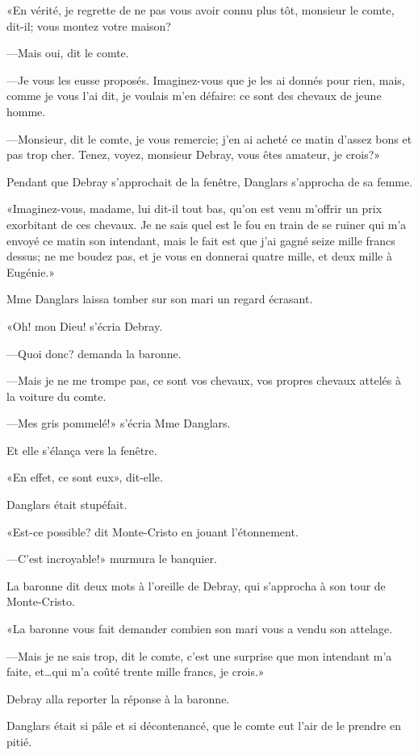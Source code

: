 «En vérité, je regrette de ne pas vous avoir connu plus tôt, monsieur le comte, dit-il; vous montez votre maison? 

—Mais oui, dit le comte. 

—Je vous les eusse proposés. Imaginez-vous que je les ai donnés pour rien, mais, comme je vous l'ai dit, je voulais m'en défaire: ce sont des chevaux de jeune homme.  

—Monsieur, dit le comte, je vous remercie; j'en ai acheté ce matin d'assez bons et pas trop cher. Tenez, voyez, monsieur Debray, vous êtes amateur, je crois?» 

Pendant que Debray s'approchait de la fenêtre, Danglars s'approcha de sa femme. 

«Imaginez-vous, madame, lui dit-il tout bas, qu'on est venu m'offrir un prix exorbitant de ces chevaux. Je ne sais quel est le fou en train de se ruiner qui m'a envoyé ce matin son intendant, mais le fait est que j'ai gagné seize mille francs dessus; ne me boudez pas, et je vous en donnerai quatre mille, et deux mille à Eugénie.» 

Mme Danglars laissa tomber sur son mari un regard écrasant. 

«Oh! mon Dieu! s'écria Debray. 

—Quoi donc? demanda la baronne. 

—Mais je ne me trompe pas, ce sont vos chevaux, vos propres chevaux attelés à la voiture du comte. 

—Mes gris pommelé!» s'écria Mme Danglars. 

Et elle s'élança vers la fenêtre. 

«En effet, ce sont eux», dit-elle.  

Danglars était stupéfait. 

«Est-ce possible? dit Monte-Cristo en jouant l'étonnement. 

—C'est incroyable!» murmura le banquier. 

La baronne dit deux mots à l'oreille de Debray, qui s'approcha à son tour de Monte-Cristo. 

«La baronne vous fait demander combien son mari vous a vendu son attelage. 

—Mais je ne sais trop, dit le comte, c'est une surprise que mon intendant m'a faite, et\dots qui m'a coûté trente mille francs, je crois.» 

Debray alla reporter la réponse à la baronne. 

Danglars était si pâle et si décontenancé, que le comte eut l'air de le prendre en pitié. 

